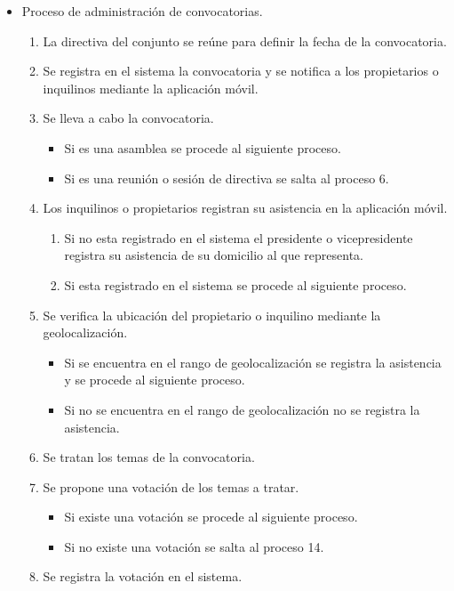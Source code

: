 \begin{itemize}
    \item Proceso de administración de convocatorias.
    \begin{enumerate}
        \item La directiva del conjunto se reúne para definir la fecha de la convocatoria.
        \item Se registra en el sistema la convocatoria y se notifica a los propietarios o inquilinos mediante la aplicación móvil.
        \item Se lleva a cabo la convocatoria.
        \begin{itemize}
            \item Si es una asamblea se procede al siguiente proceso.
            \item Si es una reunión o sesión de directiva se salta al proceso 6.
        \end{itemize}
        \item Los inquilinos o propietarios registran su asistencia en la aplicación móvil.
        \begin{enumerate}
            \item Si no esta registrado en el sistema el presidente o vicepresidente registra su asistencia de su domicilio al que representa.
            \item Si esta registrado en el sistema se procede al siguiente proceso.
        \end{enumerate}
        \item Se verifica la ubicación del propietario o inquilino mediante la geolocalización.
        \begin{itemize}
            \item Si se encuentra en el rango de geolocalización se registra la asistencia y se procede al siguiente proceso.
            \item Si no se encuentra en el rango de geolocalización no se registra la asistencia.
        \end{itemize}
        \item Se tratan los temas de la convocatoria.
        \item Se propone una votación de los temas a tratar.
        \begin{itemize}
            \item Si existe una votación se procede al siguiente proceso.
            \item Si no existe una votación se salta al proceso 14.
        \end{itemize}
        \item Se registra la votación en el sistema.

\end{enumerate}
\end{itemize}

